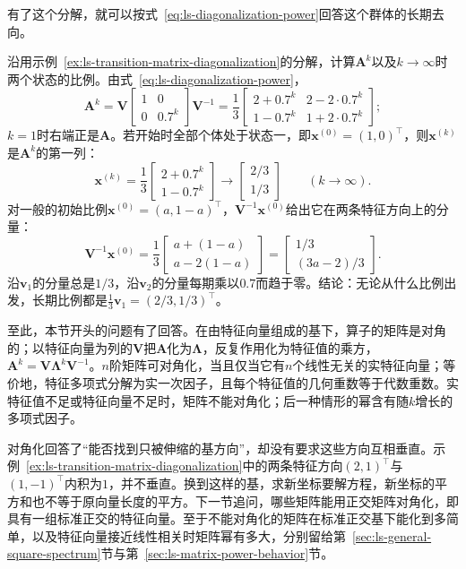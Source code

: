 有了这个分解，就可以按式~\eqref{eq:ls-diagonalization-power}回答这个群体的长期去向。
\begin{example}[转移矩阵的长期比例]
\label{ex:ls-transition-matrix-long-run}
沿用示例~\ref{ex:ls-transition-matrix-diagonalization}的分解，计算$\bm A^k$以及$k\to\infty$时两个状态的比例。由式~\eqref{eq:ls-diagonalization-power}，
\[
 \bm A^k=\bm V\begin{bmatrix}1&0\\0&0.7^k\end{bmatrix}\bm V^{-1}
 =\frac13\begin{bmatrix}2+0.7^k&2-2\cdot0.7^k\\1-0.7^k&1+2\cdot0.7^k\end{bmatrix};
\]
$k=1$时右端正是$\bm A$。若开始时全部个体处于状态一，即$\bm x^{(0)}=(1,0)^{\top}$，则$\bm x^{(k)}$是$\bm A^k$的第一列：
\[
 \bm x^{(k)}=\frac13\begin{bmatrix}2+0.7^k\\1-0.7^k\end{bmatrix}
 \to\begin{bmatrix}2/3\\1/3\end{bmatrix}\qquad(k\to\infty).
\]
对一般的初始比例$\bm x^{(0)}=(a,1-a)^{\top}$，$\bm V^{-1}\bm x^{(0)}$给出它在两条特征方向上的分量：
\[
 \bm V^{-1}\bm x^{(0)}=\frac13\begin{bmatrix}a+(1-a)\\a-2(1-a)\end{bmatrix}=\begin{bmatrix}1/3\\(3a-2)/3\end{bmatrix}.
\]
沿$\bm v_1$的分量总是$1/3$，沿$\bm v_2$的分量每期乘以$0.7$而趋于零。结论：无论从什么比例出发，长期比例都是$\tfrac13\bm v_1=(2/3,1/3)^{\top}$。
\end{example}

至此，本节开头的问题有了回答。在由特征向量组成的基下，算子的矩阵是对角的；以特征向量为列的$\bm V$把$\bm A$化为$\bm\Lambda$，反复作用化为特征值的乘方，$\bm A^k=\bm V\bm\Lambda^k\bm V^{-1}$。$n$阶矩阵可对角化，当且仅当它有$n$个线性无关的实特征向量；等价地，特征多项式分解为实一次因子，且每个特征值的几何重数等于代数重数。实特征值不足或特征向量不足时，矩阵不能对角化；后一种情形的幂含有随$k$增长的多项式因子。

对角化回答了“能否找到只被伸缩的基方向”，却没有要求这些方向互相垂直。示例~\ref{ex:ls-transition-matrix-diagonalization}中的两条特征方向$(2,1)^{\top}$与$(1,-1)^{\top}$内积为$1$，并不垂直。换到这样的基，求新坐标要解方程，新坐标的平方和也不等于原向量长度的平方。下一节追问，哪些矩阵能用正交矩阵对角化，即具有一组标准正交的特征向量。至于不能对角化的矩阵在标准正交基下能化到多简单，以及特征向量接近线性相关时矩阵幂有多大，分别留给第~\ref{sec:ls-general-square-spectrum}节与第~\ref{sec:ls-matrix-power-behavior}节。
